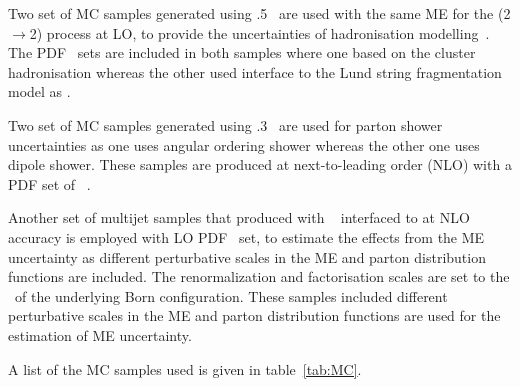Two set of MC samples generated using .5~\cite{Bothmann:2019yzt} are used with the same ME for the (2$\rightarrow$2) process at LO, to provide the uncertainties of hadronisation modelling~\cite{Schumann:2007mg,Winter:2003tt}. The \ctten PDF~\cite{Dulat:2015mca} sets are included in both \sherpa samples where one based on the cluster hadronisation whereas the other used \sherpa interface to the Lund string fragmentation~\cite{Sjostrand:2006za} model as .

Two set of MC samples generated using .3~\cite{Bellm:2015jjp} are used for parton shower uncertainties as one uses angular ordering shower whereas the other one uses dipole shower. These samples are produced at next-to-leading order (NLO) with a PDF set of \mmht~\cite{Harland-Lang:2014zoa}.


Another set of multijet samples that produced with \powheg~\cite{Nason:2004rx, Frixione:2007vw,Alioli:2010xd} interfaced to \pythia at NLO accuracy is employed with \nnpdftwo LO PDF~\cite{Ball:2014uwa} set, to estimate the effects from the ME uncertainty as different perturbative scales in the ME and parton distribution functions are included. The renormalization and factorisation scales are set to the \pt~of the underlying Born configuration. These samples included different perturbative scales in the ME and parton distribution functions are used for the estimation of ME uncertainty.




A list of the MC samples used is given in table~\ref{tab:MC}.





